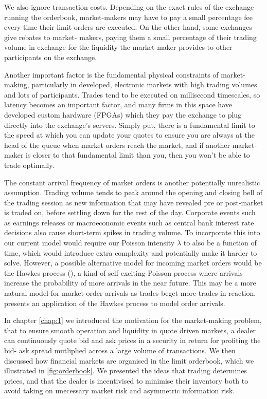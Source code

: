 We also ignore transaction costs. Depending on the exact rules of the exchange running 
the orderbook, market-makers may have to pay a small percentage fee every time their 
limit orders are executed. On the other hand, some exchanges give rebates to market-
makers, paying them a small percentage of their trading volume in exchange for the 
liquidity the market-maker provides to other participants on the exchange.

Another important factor is the fundamental physical constraints of market-making,
particularly in developed, electronic markets with high trading volumes and lots of
participants. Trades tend to be executed on millisecond timescales, so latency becomes
an important factor, and many firms in this space have developed custom hardware (FPGAs)
which they pay the exchange to plug directly into the exchange's servers. Simply put,
there is a fundamental limit to the speed at which you can update your quotes to ensure 
you are always at the head of the queue when market orders reach the market, and if 
another market-maker is closer to that fundamental limit than you, then you won't be 
able to trade optimally. 

The constant arrival frequency of market orders is another potentially unrealistic 
assumption. Trading volume tends to peak around the opening and closing bell of the 
trading session as new information that may have revealed pre or post-market is traded
on, before settling down for the rest of the day. Corporate events such as earnings 
releases or macroeconomic events such as central bank interest rate decisions also 
cause short-term spikes in trading volume. To incorporate this into our current model
would require our Poisson intensity $\lambda$ to also be a function of time, which 
would introduce extra complexity and potentially make it harder to solve. However, 
a possible alternative model for incoming market orders would be the Hawkes process
(\cite{Hawkes}), a kind of self-exciting Poisson process where arrivals increase the 
probability of more arrivals in the near future. This may be a more natural model for 
market-order arrivals as trades beget more trades in reaction. \cite{Hawkes2}
presents an application of the Hawkes process to model order arrivals.


In chapter \ref{chap:1} we introduced the motivation for the market-making problem,
that to ensure smooth operation and liquidity in quote driven markets, a dealer can 
continuously quote bid and ask prices in a security in return for profiting the bid-
ask spread mutliplied across a large volume of transactions. We then discussed how 
financial markets are organised in the limit orderbook, which we illustrated in 
\ref{fig:orderbook}. We presented the ideas that trading determines prices, and that 
the dealer is incentivised to minimise their inventory both to avoid taking on 
unecessary market risk and asymmetric information risk.

